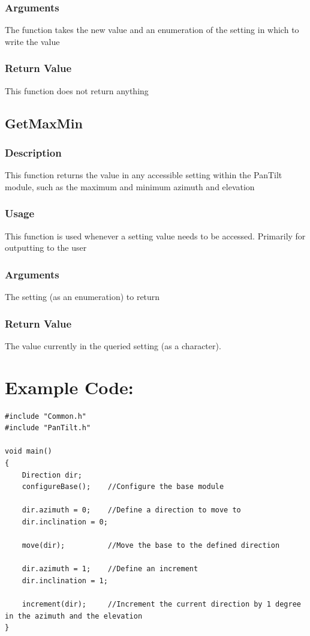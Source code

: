 \documentclass[]{report}
\begin{document}
\subsubsection{Arguments}
The function takes the new value and an enumeration of the setting in which to write the value

\subsubsection{Return Value}
This function does not return anything

\subsection{GetMaxMin}
\subsubsection{Description}
This function returns the value in any accessible setting within the PanTilt module, such as the maximum and minimum azimuth and elevation

\subsubsection{Usage}
This function is used whenever a setting value needs to be accessed. Primarily for outputting to the user

\subsubsection{Arguments}
The setting (as an enumeration) to return

\subsubsection{Return Value}
The value currently in the queried setting (as a character).

\section{Example Code:}
\begin{lstlisting}
#include "Common.h"
#include "PanTilt.h"

void main()
{
	Direction dir;
	configureBase();	//Configure the base module

	dir.azimuth = 0;	//Define a direction to move to
	dir.inclination = 0;
	
	move(dir);			//Move the base to the defined direction
	
	dir.azimuth = 1;	//Define an increment
	dir.inclination = 1;
	
	increment(dir);		//Increment the current direction by 1 degree in the azimuth and the elevation
}
\end{lstlisting}
\end{document}
